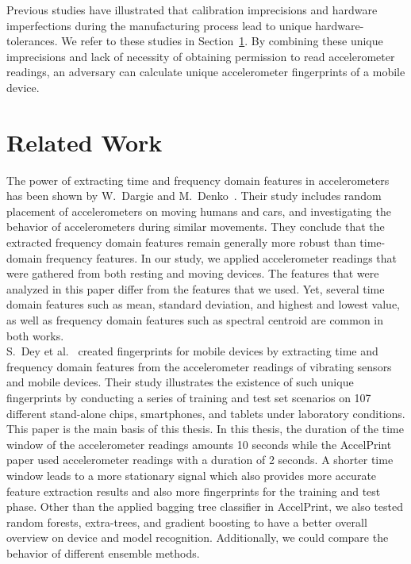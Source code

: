 Previous studies have illustrated that calibration imprecisions and hardware imperfections during the manufacturing process lead to unique hardware-tolerances. We refer to these studies in Section~\ref{ch:relatedwork}. By combining these unique imprecisions and lack of necessity of obtaining permission to read accelerometer readings, an adversary can calculate unique accelerometer fingerprints of a mobile device.

\section{Related Work}
\label{ch:relatedwork}
The power of extracting time and frequency domain features in accelerometers has been shown by W.~Dargie and M.~Denko~\cite{dargie2010analysis}. Their study includes random placement of accelerometers on moving humans and cars, and investigating the behavior of accelerometers during similar movements. They conclude that the extracted frequency domain features remain generally more robust than time-domain frequency features. In our study, we applied accelerometer readings that were gathered from both resting and moving devices. The features that were analyzed in this paper differ from the features that we used. Yet, several time domain features such as mean, standard deviation, and highest and lowest value, as well as frequency domain features such as spectral centroid are common in both works.\\
S.~Dey et al.~\cite{dey2014accelprint} created fingerprints for mobile devices by extracting time and frequency domain features from the accelerometer readings of vibrating sensors and mobile devices. Their study illustrates the existence of such unique fingerprints by conducting a series of training and test set scenarios on 107 different stand-alone chips, smartphones, and tablets under laboratory conditions. This paper is the main basis of this thesis. In this thesis, the duration of the time window of the accelerometer readings amounts 10 seconds while the AccelPrint paper used accelerometer readings with a duration of 2 seconds. A shorter time window leads to a more stationary signal which also provides more accurate feature extraction results and also more fingerprints for the training and test phase. Other than the applied bagging tree classifier in AccelPrint, we also tested random forests, extra-trees, and gradient boosting to have a better overall overview on device and model recognition. Additionally, we could compare the behavior of different ensemble methods.\\
